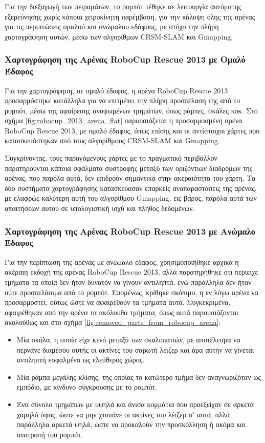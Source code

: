 \bigskip
Για την διεξαγωγή των πειραμάτων, το ρομπότ τέθηκε σε λειτουργία αυτόματης εξερεύνησης χωρίς κάποια χειροκίνητη παρέμβαση, για την κάλυψη όλης της αρένας για τις περιπτώσεις ομαλού και ανώμαλου εδάφους, με στόχο την πλήρη χαρτογράφηση αυτών, μέσω των αλγορίθμων CRSM-SLAM και Gmapping.

\subsubsection{Χαρτογράφηση της Αρένας RoboCup Rescue 2013 με Ομαλό Έδαφος}
Για την χαρτογράφηση, σε ομαλό έδαφος, η αρένα RoboCup Rescue 2013 προσαρμόστηκε κατάλληλα για να επιτρέπει την πλήρη προσπέλαση της από το ρομπότ, μέσω της αφαίρεσης ανυψωμένων τμημάτων, όπως ράμπες, σκάλες κοκ. Στο σχήμα \ref{fig:robocup_2013_arena_flat} παρουσιάζεται η προσαρμοσμένη αρένα RoboCup Rescue 2013, με ομαλό έδαφος, όπως επίσης και οι αντίστοιχοι χάρτες που κατασκευάστηκαν από τους αλγορίθμους CRSM-SLAM και Gmapping.

\bigskip
Συγκρίνοντας, τους παραγόμενους χάρτες με το πραγματικό περιβάλλον παρατηρούνται κάποια σφάλματα συστροφής μεταξύ των οριζόντιων διαδρόμων της αρένας, που παρόλα αυτά, δεν επιδρούν σημαντικά στην ακεραιότητα του χάρτη. Τα δύο συστήματα χαρτογράφησης κατασκεύασαν επαρκείς αναπαραστάσεις της αρένας, με ελαφρώς καλύτερη αυτή του αλγορίθμου Gmapping, εις βάρος, παρόλα αυτά των απαιτήσεων αυτού σε υπολογιστική ισχύ και πλήθος δεδομένων. 

\subsubsection{Χαρτογράφηση της Αρένας RoboCup Rescue 2013 με Ανώμαλο Έδαφος}
Για την περίπτωση της αρένας με ανώμαλο έδαφος, χρησιμοποιήθηκε αρχικά η ακέραιη εκδοχή της αρένας RoboCup Rescue 2013, αλλά παρατηρήθηκε ότι περιείχε τμήματα τα οποία δεν ήταν δυνατόν να γίνουν αντιληπτά, ενώ παράλληλα δεν ήταν ούτε προσπελάσιμα από το ρομπότ. Επομένως, κρίθηκε σκόπιμο, η εν λόγω αρένα να προσαρμοστεί, ούτως ώστε να αφαιρεθούν τα τμήματα αυτά. Συγκεκριμένα, αφαιρέθηκαν από την αρένα τα ακόλουθα τμήματα, όπως αυτά παρουσιάζονται ακολούθως και στο σχήμα \ref{fig:removed_parts_from_robocup_arena}:

\begin{itemize}
	\item Μία σκάλα, η οποία είχε κενό μεταξύ των σκαλοπατιών, με αποτέλεσμα να περνάνε διαμέσου αυτής οι ακτίνες του σαρωτή λέιζερ και άρα αυτήν να γίνεται αντιληπτή εσφαλμένα ως ελεύθερος χώρος.
	\item Μία ράμπα μεγάλης κλίσης, της οποίας το κατώτερο τμήμα δεν αναγνωριζόταν ως εμπόδιο, με κίνδυνο σύγκρουσης με το ρομπότ.
	\item Ένα σύνολο τμημάτων με υψηλά και άνισα κομμάτια που προεξείχαν σε αρκετά χαμηλό ύψος, ώστε να μην χτυπάνε οι ακτίνες του λέιζερ σ' αυτά, αλλά παράλληλα αρκετά ψηλά, ώστε να προκαλούν την προσκόλληση ή ακόμα και ανατροπή του ρομπότ.
\end{itemize}

